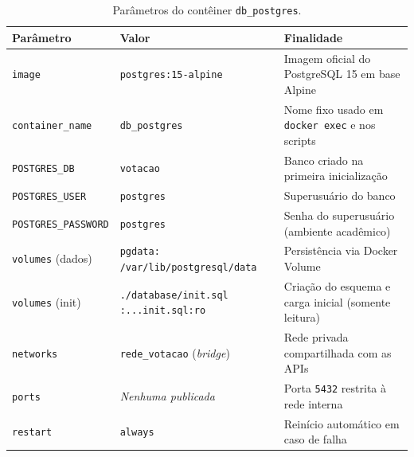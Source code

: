 \documentclass[12pt,a4paper]{article}
\begin{document}
\begin{table}[h!]
\centering
\small
\begin{tabular}{p{3.6cm}p{4.8cm}p{5.4cm}}
\toprule
\textbf{Parâmetro} & \textbf{Valor} & \textbf{Finalidade} \\
\midrule
\texttt{image} & \texttt{postgres:15-alpine} & Imagem oficial do PostgreSQL 15 em base Alpine \\
\texttt{container\_name} & \texttt{db\_postgres} & Nome fixo usado em \texttt{docker exec} e nos scripts \\
\texttt{POSTGRES\_DB} & \texttt{votacao} & Banco criado na primeira inicialização \\
\texttt{POSTGRES\_USER} & \texttt{postgres} & Superusuário do banco \\
\texttt{POSTGRES\_PASSWORD} & \texttt{postgres} & Senha do superusuário (ambiente acadêmico) \\
\texttt{volumes} (dados) & \texttt{pgdata:
/var/lib/postgresql/data} & Persistência via Docker Volume \\
\texttt{volumes} (init) & \texttt{./database/init.sql
:...init.sql:ro} & Criação do esquema e carga inicial (somente leitura) \\
\texttt{networks} & \texttt{rede\_votacao} (\textit{bridge}) & Rede privada compartilhada com as APIs \\
\texttt{ports} & \textit{Nenhuma publicada} & Porta \texttt{5432} restrita à rede interna \\
\texttt{restart} & \texttt{always} & Reinício automático em caso de falha \\
\bottomrule
\end{tabular}
\caption{Parâmetros do contêiner \texttt{db\_postgres}.}
\label{tab:config_db}
\end{table}
\end{document}
